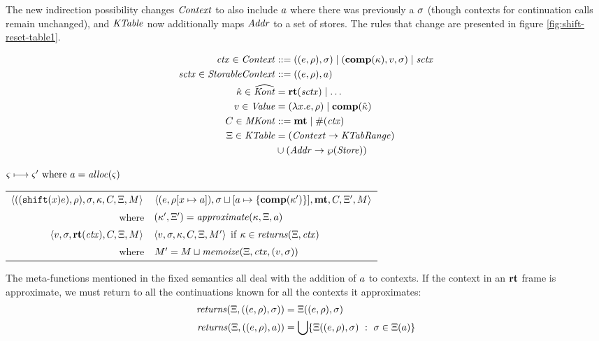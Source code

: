 The new indirection possibility changes $\mathit{Context}$ to also include $a$ where there was previously a $\sigma$ (though contexts for continuation calls remain unchanged), and $\mathit{KTable}$ now additionally maps $\mathit{Addr}$ to a set of stores.
%
The rules that change are presented in figure \ref{fig:shift-reset-table1}.

\begin{align*}
  \mathit{ctx} \in \mathit{Context} &::= ((e,\rho),\sigma) \mid (\mathbf{comp}(\kappa),v,\sigma) \mid \mathit{sctx} \\
  \mathit{sctx} \in \mathit{StorableContext} &::= ((e,\rho),a) \\
  \hat{\kappa} \in \widehat{\mathit{Kont}} &= \mathbf{rt}(\mathit{sctx}) \mid \ldots \\
  v \in \mathit{Value} &= (\lambda{} x. e, \rho) \mid \mathbf{comp}(\hat{\kappa}) \\
  C \in \mathit{MKont} &::= \mathbf{mt} \mid \#(\mathit{ctx}) \\
  \Xi \in \mathit{KTable} &= (\mathit{Context} \to \mathit{KTabRange}) \\
                   &\cup (\mathit{Addr} \to \wp(\mathit{Store}))
\end{align*}

\begin{figure*}
  \centering
  $\varsigma \longmapsto \varsigma' \text{ where } a = \mathit{alloc}(\varsigma)$ \\
  \begin{tabular}{r|l}
    \hline
    $\langle ((\texttt{shift} (x) e), \rho), \sigma, \kappa, C, \Xi, M \rangle$
    &
    $\langle (e, \rho[x \mapsto a]), \sigma\sqcup[a \mapsto \{ \mathbf{comp}(\kappa') \}],\mathbf{mt},C,\Xi',M \rangle$
    \\
    where & $(\kappa',\Xi') = \mathit{approximate}(\kappa, \Xi, a)$
\\
   $\langle v, \sigma, \mathbf{rt}(\mathit{ctx}), C, \Xi, M \rangle$
   &
   $\langle v, \sigma, \kappa, C, \Xi, M' \rangle$
   if $\kappa \in \mathit{returns}(\Xi, \mathit{ctx})$
   \\
   where & $M' = M \sqcup \mathit{memoize}(\Xi, \mathit{ctx}, (v, \sigma))$
  \end{tabular}
  \caption{Fixed table-based semantics for shift/reset}
  \label{fig:shift-reset-table1}
\end{figure*}

The meta-functions mentioned in the fixed semantics all deal with the addition of $a$ to contexts.
%
If the context in an $\mathbf{rt}$ frame is approximate, we must return to all the continuations known for all the contexts it approximates:
\begin{align*}
  \mathit{returns}(\Xi, ((e,\rho), \sigma)) &= \Xi((e,\rho), \sigma) \\
  \mathit{returns}(\Xi, ((e,\rho), a)) &=
    \bigcup\{ \Xi((e,\rho),\sigma)\ :\ \sigma \in \Xi(a)\}
\end{align*}

